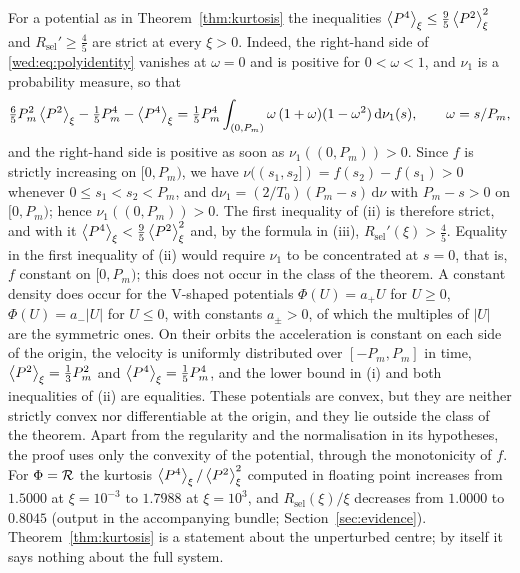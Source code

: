 \begin{remark}\label{wed:rem:sharp}
For a potential as in Theorem~\ref{thm:kurtosis} the inequalities $\left\langle P^4\right\rangle_\xi\le\tfrac95\left\langle P^2\right\rangle_\xi^2$ and $R_{\mathrm{sel}}'\ge\tfrac45$ are strict at every $\xi>0$. Indeed, the right-hand side of \eqref{wed:eq:polyidentity} vanishes at $\omega=0$ and is positive for $0<\omega<1$, and $\nu_1$ is a probability measure, so that
\[
\tfrac65P_m^2\left\langle P^2\right\rangle_\xi-\tfrac15P_m^4-\left\langle P^4\right\rangle_\xi=\tfrac15P_m^4\int_{(0,P_m)}\omega\,(1+\omega)(1-\omega^2)\,\mathrm d\nu_1(s),\qquad \omega=s/P_m ,
\]
and the right-hand side is positive as soon as $\nu_1((0,P_m))>0$. Since $f$ is strictly increasing on $[0,P_m)$, we have $\nu((s_1,s_2])=f(s_2)-f(s_1)>0$ whenever $0\le s_1<s_2<P_m$, and $\mathrm d\nu_1=(2/T_0)(P_m-s)\,\mathrm d\nu$ with $P_m-s>0$ on $[0,P_m)$; hence $\nu_1((0,P_m))>0$. The first inequality of (ii) is therefore strict, and with it $\left\langle P^4\right\rangle_\xi<\tfrac95\left\langle P^2\right\rangle_\xi^2$ and, by the formula in (iii), $R_{\mathrm{sel}}'(\xi)>\tfrac45$. Equality in the first inequality of (ii) would require $\nu_1$ to be concentrated at $s=0$, that is, $f$ constant on $[0,P_m)$; this does not occur in the class of the theorem. A constant density does occur for the V-shaped potentials $\Phi(U)=a_+U$ for $U\ge0$, $\Phi(U)=a_-|U|$ for $U\le0$, with constants $a_\pm>0$, of which the multiples of $|U|$ are the symmetric ones. On their orbits the acceleration is constant on each side of the origin, the velocity is uniformly distributed over $[-P_m,P_m]$ in time, $\left\langle P^2\right\rangle_\xi=\tfrac13P_m^2$ and $\left\langle P^4\right\rangle_\xi=\tfrac15P_m^4$, and the lower bound in (i) and both inequalities of (ii) are equalities. These potentials are convex, but they are neither strictly convex nor differentiable at the origin, and they lie outside the class of the theorem. Apart from the regularity and the normalisation in its hypotheses, the proof uses only the convexity of the potential, through the monotonicity of $f$. For $\Phi=\mathcal R$ the kurtosis $\left\langle P^4\right\rangle_\xi/\left\langle P^2\right\rangle_\xi^2$ computed in floating point increases from $1.5000$ at $\xi=10^{-3}$ to $1.7988$ at $\xi=10^{3}$, and $R_{\mathrm{sel}}(\xi)/\xi$ decreases from $1.0000$ to $0.8045$ (output  in the accompanying bundle; Section~\ref{sec:evidence}). Theorem~\ref{thm:kurtosis} is a statement about the unperturbed centre; by itself it says nothing about the full system.
\end{remark}

